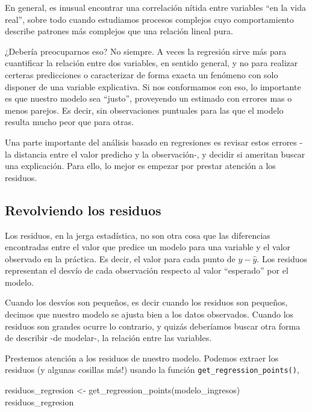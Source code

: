 \documentclass[
]{book}
\newenvironment{Shaded}{\begin{snugshade}}{\end{snugshade}}
\newcommand{\FunctionTok}[1]{\textcolor[rgb]{0.00,0.00,0.00}{#1}}
\newcommand{\NormalTok}[1]{#1}
\newcommand{\OtherTok}[1]{\textcolor[rgb]{0.56,0.35,0.01}{#1}}
\begin{document}
En general, es inusual encontrar una correlación nítida entre variables ``en la vida real'', sobre todo cuando estudiamos procesos complejos cuyo comportamiento describe patrones más complejos que una relación lineal pura.

¿Debería preocuparnos eso? No siempre. A veces la regresión sirve más para cuantificar la relación entre dos variables, en sentido general, y no para realizar certeras predicciones o caracterizar de forma exacta un fenómeno con solo disponer de una variable explicativa. Si nos conformamos con eso, lo importante es que nuestro modelo sea ``justo'', proveyendo un estimado con errores mas o menos parejos. Es decir, sin observaciones puntuales para las que el modelo resulta mucho peor que para otras.

Una parte importante del análisis basado en regresiones es revisar estos errores -la distancia entre el valor predicho y la observación-, y decidir si ameritan buscar una explicación. Para ello, lo mejor es empezar por prestar atención a los residuos.

\hypertarget{revolviendo-los-residuos}{%
\subsection{Revolviendo los residuos}\label{revolviendo-los-residuos}}

Los residuos, en la jerga estadística, no son otra cosa que las diferencias encontradas entre el valor que predice un modelo para una variable y el valor observado en la práctica. Es decir, el valor para cada punto de \(y - \widehat{y}\). Los residuos representan el desvío de cada observación respecto al valor ``esperado'' por el modelo.

Cuando los desvíos son pequeños, es decir cuando los residuos son pequeños, decimos que nuestro modelo se ajusta bien a los datos observados. Cuando los residuos son grandes ocurre lo contrario, y quizás deberíamos buscar otra forma de describir -de modelar-, la relación entre las variables.

Prestemos atención a los residuos de nuestro modelo. Podemos extraer los residuos (y algunas cosillas más!) usando la función \texttt{get\_regression\_points()},

\begin{Shaded}
\begin{Highlighting}[]
\NormalTok{residuos\_regresion }\OtherTok{\textless{}{-}} \FunctionTok{get\_regression\_points}\NormalTok{(modelo\_ingresos)}
\NormalTok{residuos\_regresion}
\end{Highlighting}
\end{Shaded}
\end{document}
